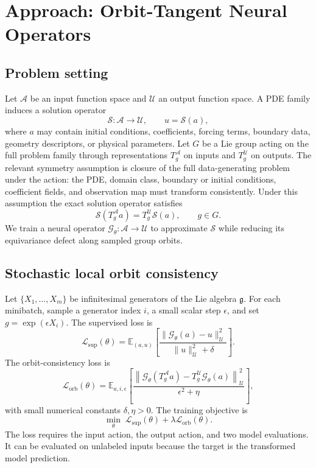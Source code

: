 \section{Approach: Orbit-Tangent Neural Operators}

\subsection{Problem setting}
Let \(\mathcal{A}\) be an input function space and \(\mathcal{U}\) an output function space. A PDE family induces a solution operator
\[
    \mathcal{S}: \mathcal{A} \to \mathcal{U}, \qquad u = \mathcal{S}(a),
\]
where \(a\) may contain initial conditions, coefficients, forcing terms, boundary data, geometry descriptors, or physical parameters. Let \(G\) be a Lie group acting on the full problem family through representations \(T_g^{\mathcal{A}}\) on inputs and \(T_g^{\mathcal{U}}\) on outputs. The relevant symmetry assumption is closure of the full data-generating problem under the action: the PDE, domain class, boundary or initial conditions, coefficient fields, and observation map must transform consistently. Under this assumption the exact solution operator satisfies
\[
    \mathcal{S}(T_g^{\mathcal{A}} a) = T_g^{\mathcal{U}} \mathcal{S}(a), \qquad g\in G.
\]
We train a neural operator \(\mathcal{G}_\theta:\mathcal{A}\to\mathcal{U}\) to approximate \(\mathcal{S}\) while reducing its equivariance defect along sampled group orbits.

\subsection{Stochastic local orbit consistency}
Let \(\{X_1,\ldots,X_m\}\) be infinitesimal generators of the Lie algebra \(\mathfrak{g}\). For each minibatch, sample a generator index \(i\), a small scalar step \(\epsilon\), and set \(g=\exp(\epsilon X_i)\). The supervised loss is
\[
    \mathcal{L}_{\mathrm{sup}}(\theta)
    =
    \mathbb{E}_{(a,u)}
    \left[ \frac{\|\mathcal{G}_\theta(a)-u\|_{\mathcal{U}}^2}{\|u\|_{\mathcal{U}}^2 + \delta} \right].
\]
The orbit-consistency loss is
\[
    \mathcal{L}_{\mathrm{orb}}(\theta)
    =
    \mathbb{E}_{a,i,\epsilon}
    \left[
    \frac{
    \left\|
    \mathcal{G}_\theta(T_g^{\mathcal{A}}a)
    -
    T_g^{\mathcal{U}}\mathcal{G}_\theta(a)
    \right\|_{\mathcal{U}}^2
    }{\epsilon^2 + \eta}
    \right],
\]
with small numerical constants \(\delta,\eta>0\). The training objective is
\[
    \min_\theta\; \mathcal{L}_{\mathrm{sup}}(\theta) + \lambda\mathcal{L}_{\mathrm{orb}}(\theta).
\]
The loss requires the input action, the output action, and two model evaluations. It can be evaluated on unlabeled inputs because the target is the transformed model prediction.

